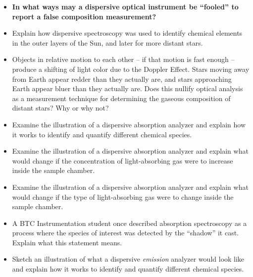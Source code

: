 \begin{itemize}
\item{} {\bf In what ways may a dispersive optical instrument be ``fooled'' to report a false composition measurement?}
\item{} Explain how dispersive spectroscopy was used to identify chemical elements in the outer layers of the Sun, and later for more distant stars.
\item{} Objects in relative motion to each other -- if that motion is fast enough -- produce a shifting of light color due to the Doppler Effect.  Stars moving away from Earth appear redder than they actually are, and stars approaching Earth appear bluer than they actually are.  Does this nullify optical analysis as a measurement technique for determining the gaseous composition of distant stars?  Why or why not?
\item{} Examine the illustration of a dispersive absorption analyzer and explain how it works to identify and quantify different chemical species.
\item{} Examine the illustration of a dispersive absorption analyzer and explain what would change if the concentration of light-absorbing gas were to increase inside the sample chamber.
\item{} Examine the illustration of a dispersive absorption analyzer and explain what would change if the type of light-absorbing gas were to change inside the sample chamber.
\item{} A BTC Instrumentation student once described absorption spectroscopy as a process where the species of interest was detected by the ``shadow'' it cast.  Explain what this statement means.
\item{} Sketch an illustration of what a dispersive {\it emission} analyzer would look like and explain how it works to identify and quantify different chemical species.
\end{itemize}




